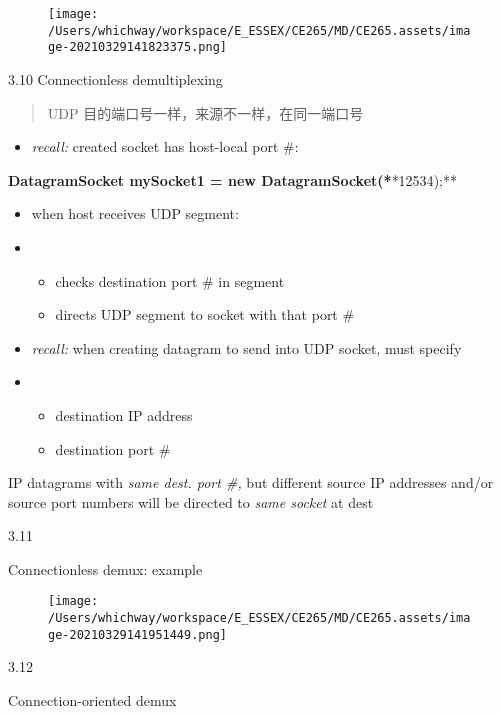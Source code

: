 \documentclass[
]{article}
\begin{document}
\begin{figure}
\centering
\texttt{[image: /Users/whichway/workspace/E\_ESSEX/CE265/MD/CE265.assets/image-20210329141823375.png]}
\caption{}
\end{figure}

3.10 Connectionless demultiplexing

\begin{quote}
UDP 目的端口号一样，来源不一样，在同一端口号
\end{quote}

\begin{itemize}
\item
  \emph{recall:} created socket has host-local port \#:
\end{itemize}

\textbf{DatagramSocket mySocket1 = new
DatagramSocket(*}*12534\textbf{});**

\begin{itemize}
\item
  when host receives UDP segment:
\item
  \begin{itemize}
  \item
    checks destination port \# in segment
  \item
    directs UDP segment to socket with that port \#
  \end{itemize}
\item
  \emph{recall:} when creating datagram to send into UDP socket, must
  specify
\item
  \begin{itemize}
  \item
    destination IP address
  \item
    destination port \#
  \end{itemize}
\end{itemize}

IP datagrams with \emph{same dest. port \#,} but different source IP
addresses and/or source port numbers will be directed to \emph{same
socket} at dest

3.11

Connectionless demux: example

\begin{figure}
\centering
\texttt{[image: /Users/whichway/workspace/E\_ESSEX/CE265/MD/CE265.assets/image-20210329141951449.png]}
\caption{}
\end{figure}

3.12

Connection-oriented demux
\end{document}
